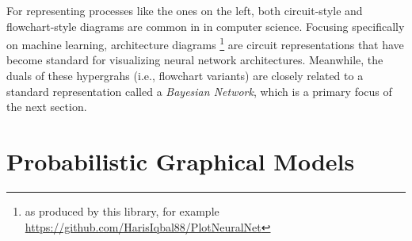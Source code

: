 {%
For representing processes like the ones on the left,
both circuit-style and flowchart-style diagrams are common in in computer science. 
Focusing specifically on machine learning, architecture diagrams%
    \footnote{as produced by this library, for example \url{https://github.com/HarisIqbal88/PlotNeuralNet}} 
are circuit representations that have become standard for visualizing neural network architectures.
%
Meanwhile, the duals of these hypergrahs (i.e., flowchart variants) are closely related to a standard representation called a \emph{Bayesian Network}, which is a primary focus of the next section. 
}%



%




\section{Probabilistic Graphical Models}
    \label{sec:prelim-pgms}


